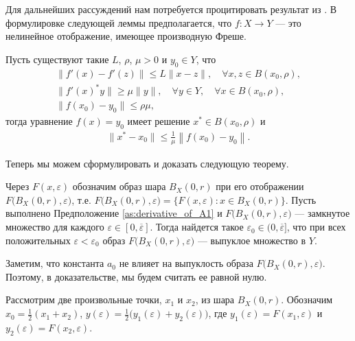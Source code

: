 \documentclass[../main.tex]{subfiles}
\begin{document}
Для дальнейших рассуждений нам потребуется процитировать результат из \cite{Polyak2001, Polyak1964}.  В формулировке следующей леммы предполагается, что $f:X \to Y$ --- это нелинейное отображение, имеющее производную Фреше.
\begin{lemma}\label{lem:Polyak_lemma}
    Пусть существуют такие $L$, $\rho$, $\mu > 0$ и $y_0 \in Y$, что 
    \begin{gather*}
        \| f'(x) - f'(z) \| \leqslant L \| x - z\|, \quad \forall x,z \in B(x_0,\rho), \\
        \| f'(x)^*y \| \geqslant \mu \|y \|, \quad \forall y \in Y, \quad \forall x \in B(x_0, \rho), \\
        \| f(x_0) - y_0 \| \leqslant \rho \mu,
    \end{gather*}
    тогда уравнение $f(x) = y_0$ имеет решение $x^* \in B(x_0,\rho)$ и 
    \begin{gather*}
        \|x^* - x_0\| \leqslant \frac{1}{\mu} \left\| f(x_0) - y_0 \right\|.
    \end{gather*}
\end{lemma}
Теперь мы можем сформулировать и доказать следующую теорему.
\begin{theorem}\label{th:ImageConvexity}
    Через $F(x,\varepsilon)$ обозначим образ шара $B_X(0, r)$ при его отображении $F\big(B_X(0,r),\varepsilon\big)$, т.е. $F\big(B_X(0,r),\varepsilon\big) = \big\{F(x,\varepsilon): x\in B_X(0, r)\big\}$.
    Пусть выполнено Предположение \ref{as:derivative_of_A1} и $F\big(B_X(0,r),\varepsilon\big)$ --- замкнутое множество для каждого  $\varepsilon \in [0, \overline{\varepsilon}]$. Тогда найдется такое $ \varepsilon_0 \in (0, \overline{\varepsilon}]$, что при всех положительных $\varepsilon < \varepsilon_0$ образ $F\big(B_X(0,r),\varepsilon\big)$ --- выпуклое множество в $Y$. 
\end{theorem}
\doc
Заметим, что константа $a_0$ не влияет на выпуклость образа $F\big(B_X(0,r),\varepsilon\big)$. 
Поэтому, в доказательстве, мы будем считать ее равной нулю.

Рассмотрим две произвольные точки, $x_1$ и $x_2$, из шара $B_X(0,r)$. 
Обозначим $x_0 = \frac{1}{2}(x_1 + x_2)$, $y(\varepsilon) = \frac{1}{2}\big(y_1(\varepsilon)  + y_2(\varepsilon)\big)$, где $y_1(\varepsilon) = F(x_1, \varepsilon)$ и $y_2(\varepsilon) = F(x_2, \varepsilon)$. 
\end{document}
